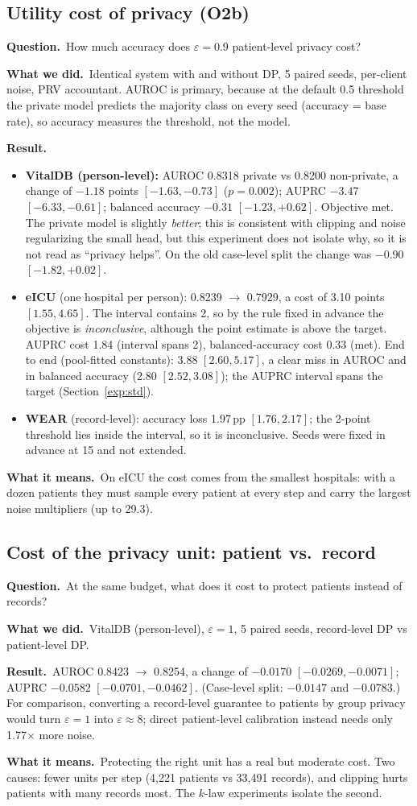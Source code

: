 \documentclass[11pt,a4paper]{article}
\newenvironment{experiment}[2]{\subsection{#1}\label{#2}}{}
\newcommand{\Q}{\par\textbf{Question.}\ }
\newcommand{\D}{\par\textbf{What we did.}\ }
\newcommand{\R}{\par\textbf{Result.}\ }
\newcommand{\M}{\par\textbf{What it means.}\ }
\begin{document}
\begin{experiment}{Utility cost of privacy (O2b)}{exp:o2b}
\Q How much accuracy does $\varepsilon = 0.9$ patient-level privacy cost?
\D Identical system with and without DP, 5 paired seeds, per-client noise, PRV
accountant. AUROC is primary, because at the default 0.5 threshold the private
model predicts the majority class on every seed (accuracy = base rate), so
accuracy measures the threshold, not the model.
\R
\begin{itemize}
\item \textbf{VitalDB (person-level):} AUROC 0.8318 private vs 0.8200
non-private, a change of $-1.18$ points $[-1.63, -0.73]$ ($p = 0.002$); AUPRC
$-3.47$ $[-6.33, -0.61]$; balanced accuracy $-0.31$ $[-1.23, +0.62]$. Objective
met. The private model is slightly \emph{better}; this is consistent with
clipping and noise regularizing the small head, but this experiment does not
isolate why, so it is not read as ``privacy helps''. On the old case-level split
the change was $-0.90$ $[-1.82, +0.02]$.
\item \textbf{eICU} (one hospital per person): 0.8239 $\rightarrow$ 0.7929, a cost of 3.10 points
$[1.55, 4.65]$. The interval contains 2, so by the rule fixed in advance the
objective is \emph{inconclusive}, although the point estimate is above the
target. AUPRC cost 1.84 (interval spans 2), balanced-accuracy cost 0.33 (met).
End to end (pool-fitted constants): 3.88 $[2.60, 5.17]$, a clear miss in AUROC
and in balanced accuracy (2.80 $[2.52, 3.08]$);
the AUPRC interval spans the target
(Section~\ref{exp:std}).
\item \textbf{WEAR} (record-level): accuracy loss 1.97\,pp $[1.76, 2.17]$; the
2-point threshold lies inside the interval, so it is inconclusive. Seeds were
fixed in advance at 15 and not extended.
\end{itemize}
\M On eICU the cost comes from the smallest hospitals: with a dozen patients
they must sample every patient at every step and carry the largest noise
multipliers (up to 29.3).
\end{experiment}

\begin{experiment}{Cost of the privacy unit: patient vs.\ record}{exp:unit}
\Q At the same budget, what does it cost to protect patients instead of records?
\D VitalDB (person-level), $\varepsilon = 1$, 5 paired seeds, record-level DP vs
patient-level DP.
\R AUROC 0.8423 $\rightarrow$ 0.8254, a change of $-0.0170$ $[-0.0269, -0.0071]$;
AUPRC $-0.0582$ $[-0.0701, -0.0462]$. (Case-level split: $-0.0147$ and
$-0.0783$.) For comparison, converting a record-level
guarantee to patients by group privacy would turn $\varepsilon = 1$ into
$\varepsilon \approx 8$; direct patient-level calibration instead needs only
1.77$\times$ more noise.
\M Protecting the right unit has a real but moderate cost. Two causes: fewer
units per step (4{,}221 patients vs 33{,}491 records), and clipping hurts
patients with many records most. The $k$-law experiments isolate the second.
\end{experiment}
\end{document}
